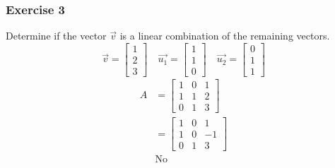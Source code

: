 \documentclass[letterpaper, 12pt]{math}
\begin{document}
\subsubsection*{Exercise 3}
Determine if the vector \( \vec{v} \) is a linear combination of the remaining
vectors.
\[ \vec{v} = \begin{bmatrix}1 \\ 2 \\ 3\end{bmatrix} \quad
  \vec{u_1} = \begin{bmatrix}1 \\ 1 \\ 0\end{bmatrix} \quad
  \vec{u_2} = \begin{bmatrix}0 \\ 1 \\ 1\end{bmatrix} \]
\begin{align*}
  A &= \begin{bmatrix}
    1 & 0 & 1 \\
    1 & 1 & 2 \\
    0 & 1 & 3
  \end{bmatrix} \\
  &= \begin{bmatrix}
    1 & 0 & 1 \\
    1 & 0 & -1 \\
    0 & 1 & 3
  \end{bmatrix} \\
  & \text{No}
\end{align*}
\end{document}
